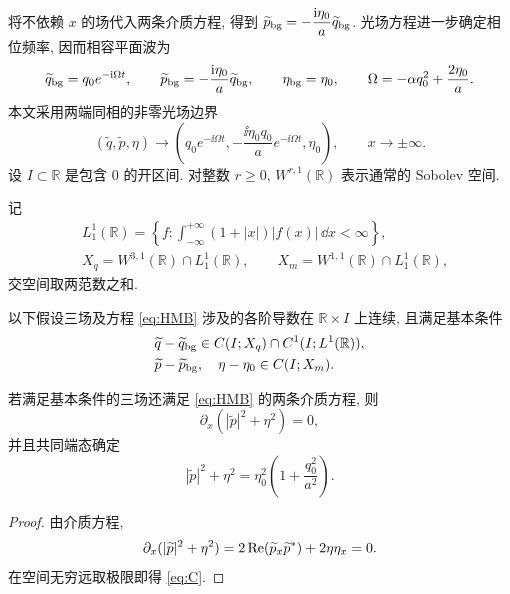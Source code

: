 将不依赖 $x$ 的场代入两条介质方程, 得到 $\widetilde p_{\rm bg}=-\dfrac{\mathrm{i}\eta_0}{a}\widetilde q_{\rm bg}$.
光场方程进一步确定相位频率, 因而相容平面波为
\begin{equation}\label{eq:background}
\widetilde q_{\rm bg}=q_0e^{-\mathrm{i}\Omega t},\qquad
\widetilde p_{\rm bg}=-\dfrac{\mathrm{i}\eta_0}{a}\widetilde q_{\rm bg},\qquad
\eta_{\rm bg}=\eta_0,\qquad
\Omega=-\alpha q_0^2+\dfrac{2\eta_0}{a}.
\end{equation}
本文采用两端同相的非零光场边界
\begin{equation}\label{eq:targetboundary}
(\widetilde q,\widetilde p,\eta)\longrightarrow
\left(q_0e^{-\ii\Omega t},-\dfrac{\ii\eta_0q_0}{a}e^{-\ii\Omega t},\eta_0\right),
\qquad x\longrightarrow\pm\infty.
\end{equation}
设 $I\subset\mathbb R$ 是包含 $0$ 的开区间. 对整数 $r\ge0$,
$W^{r,1}(\mathbb R)$ 表示通常的 Sobolev 空间.
\begin{definition}\label{def:perturbation-spaces}
记
\begin{equation}\label{eq:basic-spaces}
\begin{aligned}
&L^1_1(\mathbb R)=
\left\{f:\int_{-\infty}^{+\infty}(1+|x|)|f(x)|\,\dd x<\infty\right\},\\
&X_q=W^{3,1}(\mathbb R)\cap L^1_1(\mathbb R),\qquad
X_m=W^{1,1}(\mathbb R)\cap L^1_1(\mathbb R),
\end{aligned}
\end{equation}
交空间取两范数之和.
\end{definition}
以下假设三场及方程 \eqref{eq:HMB} 涉及的各阶导数在 $\mathbb R\times I$ 上连续, 且满足基本条件
\begin{equation}\label{eq:physical-regularity}
\begin{aligned}
&\widetilde q-\widetilde q_{\rm bg}
\in C(I;X_q)\cap C^1(I;L^1(\mathbb R)),\\
&\widetilde p-\widetilde p_{\rm bg},\quad \eta-\eta_0
\in C(I;X_m).
\end{aligned}
\end{equation}

\begin{lemma}\label{prop:bloch}
若满足基本条件的三场还满足 \eqref{eq:HMB} 的两条介质方程, 则
\begin{equation}\label{eq:bloch}
\partial_x(|\widetilde p|^2+\eta^2)=0,
\end{equation}
并且共同端态确定
\begin{equation}\label{eq:C}
|\widetilde p|^2+\eta^2=\eta_0^2\left(1+\dfrac{q_0^2}{a^2}\right).
\end{equation}
\end{lemma}
\begin{proof}
由介质方程,
\begin{equation*}
\partial_x(|\widetilde p|^2+\eta^2)
=2\operatorname{Re}(\widetilde p_x{\widetilde p}^{*})+2\eta\eta_x=0.
\end{equation*}
在空间无穷远取极限即得 \eqref{eq:C}.
\end{proof}
